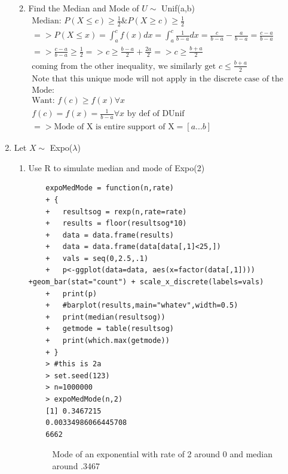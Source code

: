 \documentclass[11pt]{article}
\begin{document}
\begin{enumerate}
\begin{enumerate}
\begin{figure}[H]
	\end{figure}
	\item Find the Median and Mode of $U \sim $ Unif(a,b)
	\begin{gather}
	\text{Median: }P(X\le c) \ge \frac{1}{2} \&  P(X\ge c) \ge \frac{1}{2} \\
	=> P(X\le x) = \int_{a}^{c}f(x)dx = \int_{a}^{c}\frac{1}{b-a}dx =\frac{c}{b-a} - \frac{a}{b-a} = \frac{c-a}{b-a}\\
	=> \frac{c-a}{b-a} \ge \frac{1}{2} => c \ge \frac{b-a}{2} + \frac{2a}{2} => c\ge \frac{b+a}{2}\\
	\text{coming from the other inequality, we similarly get }c \le \frac{b+a}{2}\\
	\text{Note that this unique mode will not apply in the discrete case of the uniform distribution}\\
	\text{Mode: }\\
	\text{Want: } f(c) \ge f(x) \forall x\\
	f(c)=f(x)=\frac{1}{b-a} \forall x \text{ by def of DUnif}\\
	=>\text{Mode of X is entire support of X} =[a...b]
	\end{gather}
\end{enumerate}
\item Let $ X \sim  $ Expo($ \lambda $)
\\
\begin{enumerate}
	\item Use R to simulate median and mode of Expo(2)
	\\
	\begin{verbatim}
	expoMedMode = function(n,rate)
	+ {
	+   resultsog = rexp(n,rate=rate)
	+   results = floor(resultsog*10)
	+   data = data.frame(results)
	+   data = data.frame(data[data[,1]<25,])
	+   vals = seq(0,2.5,.1)
	+   p<-ggplot(data=data, aes(x=factor(data[,1]))) +geom_bar(stat="count") + scale_x_discrete(labels=vals)
	+   print(p)
	+   #barplot(results,main="whatev",width=0.5)
	+   print(median(resultsog))
	+   getmode = table(resultsog)
	+   print(which.max(getmode))
	+ }
	> #this is 2a
	> set.seed(123)
	> n=1000000
	> expoMedMode(n,2)
	[1] 0.3467215
	0.00334986066445708 
	6662 
	\end{verbatim}
	\begin{figure}[H]
		\centering
		\caption{Mode of an exponential with rate of 2 around 0 and median around .3467}

\end{figure}
\end{enumerate}
\end{enumerate}
\end{document}
